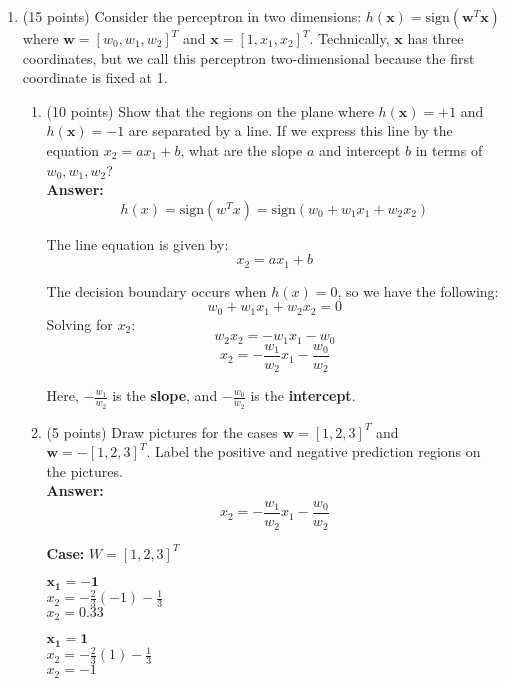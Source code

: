 \documentclass[11pt]{article}
\begin{document}
\begin{enumerate}
\item (15 points) Consider the perceptron in two dimensions:
$h(\boldsymbol x) = \mbox{sign}(\boldsymbol w^T \boldsymbol x)$
where $\boldsymbol w = [w_0, w_1, w_2]^T$ and $\boldsymbol x =
[1, x_1, x_2]^T$. Technically, $\boldsymbol x$ has three
coordinates, but we call this perceptron two-dimensional because
the first coordinate is fixed at 1.

\begin{enumerate}
    \item (10 points) Show that the regions on the plane where $h(\boldsymbol
    x) = +1$ and $h(\boldsymbol x) = -1$ are separated by a line.
    If we express this line by the equation $x_2 = ax_1 + b$,
    what are the slope $a$ and intercept $b$ in terms of $w_0, w_1,
    w_2$?\\

    \textbf{Answer:}
\[h(x) = \text{sign}(w^T x) = \text{sign}(w_0 + w_1 x_1 + w_2 x_2)\]

The line equation is given by:
\[x_2 = a x_1 + b\]

The decision boundary occurs when $h(x) = 0$, so we have the following:
\[w_0 + w_1 x_1 + w_2 x_2 = 0\]
Solving for $x_2$:
\[w_2 x_2 = -w_1 x_1 - w_0\]
\[x_2 = - \frac{w_1}{w_2} x_1 - \frac{w_0}{w_2}\]

Here, $-\frac{w_1}{w_2}$ is the \textbf{slope}, and $-\frac{w_0}{w_2}$ is the \textbf{intercept}. \\

    \item (5 points) Draw pictures for the cases $\boldsymbol w=[1,2,3]^T$
    and $\boldsymbol w=-[1,2,3]^T$. Label the positive and negative
    prediction regions on the pictures.\\

        \textbf{Answer:}
\[x_2 = - \frac{w_1}{w_2} x_1 - \frac{w_0}{w_2}\]

\textbf{Case:} $W = [1, 2, 3]^T$\vspace{0.5cm}

\begin{minipage}{0.45\textwidth}
    \textbf{$\boldsymbol{x_1 = -1}$}\\
    $x_2 = - \frac{2}{3}(-1) - \frac{1}{3}$\\
    $x_2 = 0.33$
\end{minipage}
\hfill %
\begin{minipage}{0.45\textwidth}
    \textbf{$\boldsymbol{x_1 = 1}$}\\
    $x_2 = - \frac{2}{3}(1) - \frac{1}{3}$\\
    $x_2 = -1$
\end{minipage}


\end{enumerate}
\end{enumerate}
\end{document}

